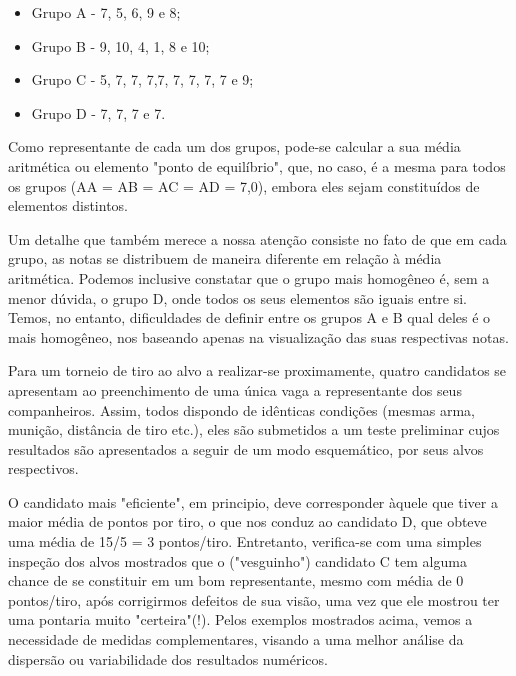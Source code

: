   \begin{itemize}
    \item Grupo A - 7, 5, 6, 9 e 8;
    \item Grupo B - 9, 10, 4, 1, 8 e 10;
    \item Grupo C - 5, 7, 7, 7,7, 7, 7, 7, 7 e 9;
    \item Grupo D - 7, 7, 7 e 7.
  \end{itemize}

\vskip0.3cm

Como representante de cada um dos grupos, pode-se calcular  a  sua média  aritméti\-ca  ou elemento  "ponto  de  equilíbrio",  que,  no  caso,  é  a mesma para todos os grupos (AA =  AB = AC = AD = 7,0), embora eles sejam constituídos de elementos distintos. 


\newpage
Um detalhe que também merece a nossa atenção consiste no fato de que em cada grupo, as notas se distribuem de maneira diferente em relação à média aritmética. Podemos inclusive constatar que o grupo mais homogêneo é, sem a menor dúvida, o grupo D, onde todos os seus elementos são iguais entre si. Temos, no entanto, dificuldades de definir entre os grupos A e B qual deles é o mais homogêneo, nos baseando apenas na visualização das suas respectivas notas.\vskip0.3cm

Para um torneio de tiro ao alvo a realizar-se proximamente, quatro candidatos se apresentam ao preenchimento de uma única vaga a representante dos seus companheiros. Assim, todos dispondo de idênticas condições (mesmas arma, munição, distância de tiro etc.), eles são submetidos a um teste preliminar cujos resultados são apresentados a seguir de um modo esquemático, por seus alvos respectivos.\vskip0.3cm





O candidato mais "eficiente", em principio, deve corresponder àquele que tiver a maior média de pontos por tiro, o que nos conduz ao candidato D, que obteve uma média de 15/5 = 3 pontos/tiro.  Entretanto, verifica-se com uma simples inspeção dos alvos mostrados que o ("vesguinho") candidato C tem alguma chance de se constituir em um bom representante, mesmo com média de 0 pontos/tiro, após corrigirmos defeitos de sua visão, uma vez que ele mostrou ter uma pontaria muito "certeira"(!).  Pelos exemplos mostrados acima, vemos a necessidade de medidas complementares, visando a uma melhor análise da dispersão ou variabilidade dos resultados numéricos.\vskip0.3cm



